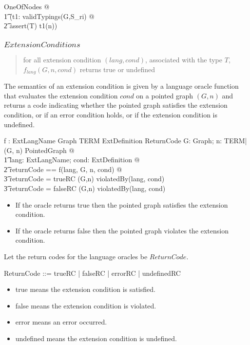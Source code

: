 \documentclass{article}
\begin{document}
\begin{zed}
	\forall OneOfNodes @ \\
\t1		\lnot (\exists t1: validTypings(G,S\_ri) @ \\
\t2			assert(T) \in t1(n))
\end{zed}

\subsubsection{$ExtensionConditions$}
\begin{quote}
for all extension condition $(lang, cond)$, associated with the type $T$, $f_{lang}(G, n, cond)$ returns true or undefined
\end{quote}

The semantics of an extension condition is given by a language oracle function
that evaluates the extension condition $cond$ on a pointed graph $(G,n)$
and returns a code indicating whether the pointed graph
satisfies the extension condition, or if an error condition holds, or if the extension condition is undefined.
\begin{axdef}
	f : ExtLangName \cross Graph \cross TERM \cross ExtDefinition \fun ReturnCode
\where
	\forall G: Graph; n: TERM| (G, n) \in PointedGraph @ \\
\t1		\forall lang: ExtLangName; cond: ExtDefinition @ \\
\t2			\LET returnCode == f(lang, G, n, cond) @ \\
\t3				returnCode = trueRC \implies (G,n) \notin violatedBy(lang, cond) \land \\
\t3				returnCode = falseRC \implies (G,n) \in violatedBy(lang, cond)
\end{axdef}
\begin{itemize}
\item If the oracle returns true then the pointed graph satisfies the extension condition.
\item If the oracle returns false then the pointed graph violates the extension condition.
\end{itemize}

Let the return codes for the language oracles be $ReturnCode$.
\begin{zed}
	ReturnCode ::= trueRC | falseRC | errorRC | undefinedRC
\end{zed}
\begin{itemize}
\item true means the extension condition is satisfied.
\item false means the extension condition is violated.
\item error means an error occurred.
\item undefined means the extension condition is undefined.
\end{itemize}
\end{document}
